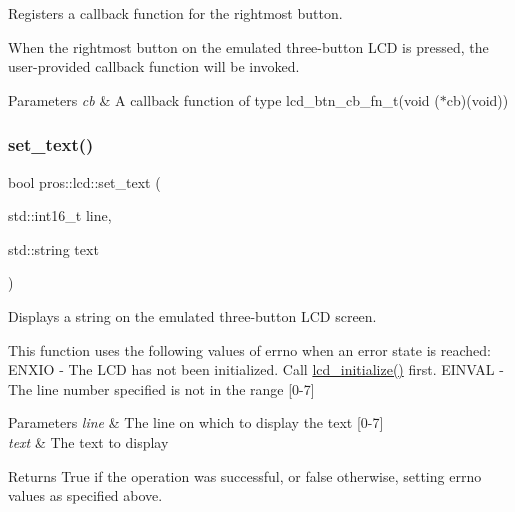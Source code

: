 Registers a callback function for the rightmost button. 

When the rightmost button on the emulated three-\/button L\+CD is pressed, the user-\/provided callback function will be invoked.


\begin{DoxyParams}{Parameters}
{\em cb} & A callback function of type lcd\+\_\+btn\+\_\+cb\+\_\+fn\+\_\+t(void ($\ast$cb)(void)) \\
\hline
\end{DoxyParams}
\mbox{\label{namespacepros_1_1lcd_a515526f1d3069a6aa985512273aa7788}} 
\subsubsection{\texorpdfstring{set\+\_\+text()}{set\_text()}}
{\footnotesize\ttfamily bool pros\+::lcd\+::set\+\_\+text (\begin{DoxyParamCaption}\item[{std\+::int16\+\_\+t}]{line,  }\item[{std\+::string}]{text }\end{DoxyParamCaption})}



Displays a string on the emulated three-\/button L\+CD screen. 

This function uses the following values of errno when an error state is reached\+: E\+N\+X\+IO -\/ The L\+CD has not been initialized. Call \hyperlink{llemu_8h_ae618494f080e95b506c0c18cb1ffb407}{lcd\+\_\+initialize()} first. E\+I\+N\+V\+AL -\/ The line number specified is not in the range \mbox{[}0-\/7\mbox{]}


\begin{DoxyParams}{Parameters}
{\em line} & The line on which to display the text \mbox{[}0-\/7\mbox{]} \\
\hline
{\em text} & The text to display\\
\hline
\end{DoxyParams}
\begin{DoxyReturn}{Returns}
True if the operation was successful, or false otherwise, setting errno values as specified above. 
\end{DoxyReturn}
\mbox{\label{namespacepros_1_1lcd_a7aa9a422049011de193f54bce8cc95ed}} 
